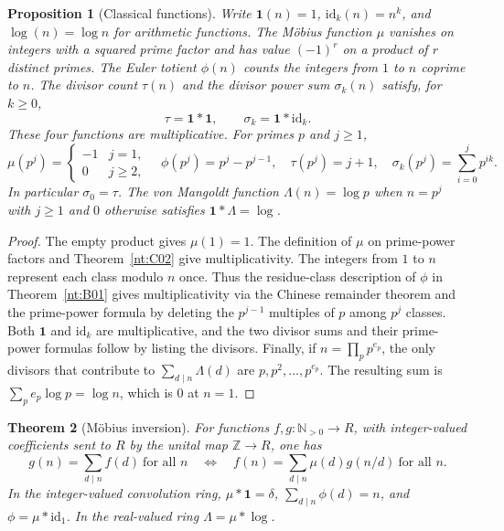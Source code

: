 \documentclass[11pt,oneside,openany]{book}
\theoremstyle{plain}
\newtheorem{theorem}{Theorem}[chapter]
\newtheorem{proposition}[theorem]{Proposition}
\theoremstyle{definition}
\theoremstyle{remark}
\begin{document}
\begin{proposition}[Classical functions]\label{nt:C03}
Write \(\mathbf{1}(n)=1\), \(\mathrm{id}_k(n)=n^k\), and
\(\log(n)=\log n\) for arithmetic functions. The M\"obius function \(\mu\)
vanishes on integers with a squared prime factor and has value
\((-1)^r\) on a product of \(r\) distinct primes. The Euler totient
\(\phi(n)\) counts the integers from \(1\) to \(n\) coprime to \(n\).
The divisor count \(\tau(n)\) and the divisor power sum \(\sigma_k(n)\)
satisfy, for \(k\ge0\),
\[
 \tau=\mathbf{1}*\mathbf{1},\qquad
 \sigma_k=\mathbf{1}*\mathrm{id}_k .
\]
These four functions are multiplicative. For primes \(p\) and \(j\ge1\),
\[
 \mu(p^j)=
 \begin{cases}-1& j=1,\\0&j\ge2,\end{cases}
 \quad
 \phi(p^j)=p^j-p^{j-1},\quad
 \tau(p^j)=j+1,\quad
 \sigma_k(p^j)=\sum_{i=0}^j p^{ik}.
\]
In particular \(\sigma_0=\tau\). The von Mangoldt function
\(\Lambda(n)=\log p\) when \(n=p^j\) with \(j\ge1\) and \(0\) otherwise
satisfies \(\mathbf{1}*\Lambda=\log\).
\end{proposition}

\begin{proof}
The empty product gives \(\mu(1)=1\). The definition of \(\mu\) on
prime-power factors and Theorem~\ref{nt:C02} give multiplicativity.
The integers from \(1\) to \(n\) represent each class modulo \(n\) once.
Thus the residue-class description of \(\phi\) in Theorem~\ref{nt:B01}
gives multiplicativity via the Chinese remainder theorem and the
prime-power formula by deleting the \(p^{j-1}\) multiples of \(p\)
among \(p^j\) classes. Both \(\mathbf{1}\) and \(\mathrm{id}_k\) are multiplicative,
and the two divisor sums and their prime-power formulas follow by
listing the divisors. Finally, if \(n=\prod_p p^{e_p}\), the only
divisors that contribute to \(\sum_{d\mid n}\Lambda(d)\) are
\(p,p^2,\ldots,p^{e_p}\). The resulting sum is
\(\sum_p e_p\log p=\log n\), which is \(0\) at \(n=1\).
\end{proof}

\begin{theorem}[M\"obius inversion]\label{nt:C04}
For functions \(f,g\colon\mathbb N_{>0}\to R\), with integer-valued
coefficients sent to \(R\) by the unital map \(\mathbb Z\to R\), one has
\[
 g(n)=\sum_{d\mid n}f(d)\ \text{for all }n
 \quad\Longleftrightarrow\quad
 f(n)=\sum_{d\mid n}\mu(d)g(n/d)\ \text{for all }n .
\]
In the integer-valued convolution ring,
\(\mu*\mathbf{1}=\delta\), \(\sum_{d\mid n}\phi(d)=n\), and
\(\phi=\mu*\mathrm{id}_1\). In the real-valued ring
\(\Lambda=\mu*\log\).
\end{theorem}
\end{document}
